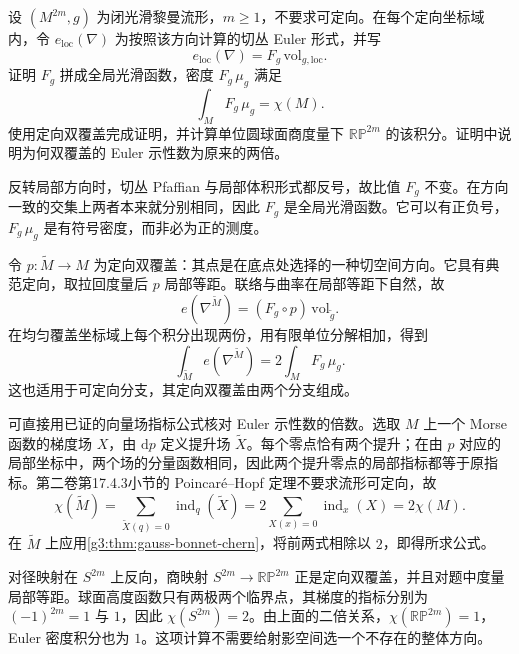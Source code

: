 \begin{exercise}\label{g3:ex:unoriented-euler-density}
	设 \((M^{2m},g)\) 为闭光滑黎曼流形，\(m\ge1\)，不要求可定向。在每个定向坐标域内，令 \(e_{\mathrm{loc}}(\nabla)\) 为按照该方向计算的切丛 Euler 形式，并写
	\[
		e_{\mathrm{loc}}(\nabla)=F_g\,\mathrm{vol}_{g,\mathrm{loc}}.
	\]
	证明 \(F_g\) 拼成全局光滑函数，密度 \(F_g\,\mu_g\) 满足
	\[
		\int_MF_g\,\mu_g=\chi(M).
	\]
	使用定向双覆盖完成证明，并计算单位圆球面商度量下 \(\mathbb{RP}^{2m}\) 的该积分。证明中说明为何双覆盖的 Euler 示性数为原来的两倍。
\end{exercise}
\begin{solution}
	反转局部方向时，切丛 Pfaffian 与局部体积形式都反号，故比值 \(F_g\) 不变。在方向一致的交集上两者本来就分别相同，因此 \(F_g\) 是全局光滑函数。它可以有正负号，\(F_g\,\mu_g\) 是有符号密度，而非必为正的测度。

	令 \(p:\widetilde M\to M\) 为定向双覆盖：其点是在底点处选择的一种切空间方向。它具有典范定向，取拉回度量后 \(p\) 局部等距。联络与曲率在局部等距下自然，故
	\[
		e(\nabla^{\widetilde M})=(F_g\circ p)\,\mathrm{vol}_{\widetilde g}.
	\]
	在均匀覆盖坐标域上每个积分出现两份，用有限单位分解相加，得到
	\[
		\int_{\widetilde M}e(\nabla^{\widetilde M})
		=2\int_MF_g\,\mu_g.
	\]
	这也适用于可定向分支，其定向双覆盖由两个分支组成。

	可直接用已证的向量场指标公式核对 Euler 示性数的倍数。选取 \(M\) 上一个 Morse 函数的梯度场 \(X\)，由 \(\mathrm dp\) 定义提升场 \(\widetilde X\)。每个零点恰有两个提升；在由 \(p\) 对应的局部坐标中，两个场的分量函数相同，因此两个提升零点的局部指标都等于原指标。第二卷第17.4.3小节的 Poincaré--Hopf 定理不要求流形可定向，故
	\[
		\chi(\widetilde M)=\sum_{\widetilde X(q)=0}\operatorname{ind}_q(\widetilde X)
		=2\sum_{X(x)=0}\operatorname{ind}_x(X)=2\chi(M).
	\]
	在 \(\widetilde M\) 上应用\cref{g3:thm:gauss-bonnet-chern}，将前两式相除以 \(2\)，即得所求公式。

	对径映射在 \(S^{2m}\) 上反向，商映射 \(S^{2m}\to\mathbb{RP}^{2m}\) 正是定向双覆盖，并且对题中度量局部等距。球面高度函数只有两极两个临界点，其梯度的指标分别为 \((-1)^{2m}=1\) 与 \(1\)，因此 \(\chi(S^{2m})=2\)。由上面的二倍关系，\(\chi(\mathbb{RP}^{2m})=1\)，Euler 密度积分也为 \(1\)。这项计算不需要给射影空间选一个不存在的整体方向。
\end{solution}

